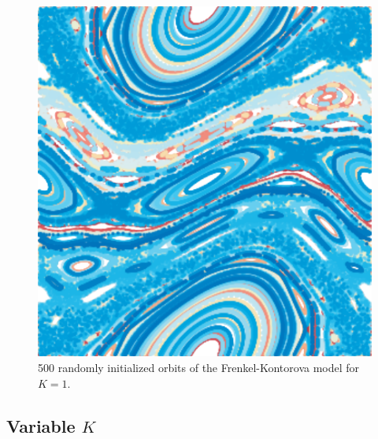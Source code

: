 	\begin{figure}
		\centering
		\includegraphics[width=0.9\columnwidth]{./img/assignment_a_pretty_low_res.pdf}
		\caption{500 randomly initialized orbits of the Frenkel-Kontorova model for $K = 1$.}
		\label{fig:a:pretty}
	\end{figure}

\subsection[]{Variable $K$}
\label{ss:variable}